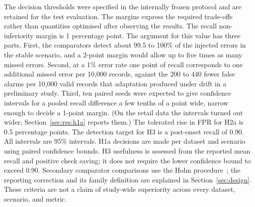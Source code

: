 The decision thresholds were specified in the internally frozen protocol and are retained for the test evaluation. The margins express the required trade-offs rather than quantities optimised after observing the results. The recall non-inferiority margin is 1 percentage point. The argument for this value has three parts. First, the comparators detect about 99.5 to 100\% of the injected errors in the stable scenario, and a 2-point margin would allow up to five times as many missed errors. Second, at a 1\% error rate one point of recall corresponds to one additional missed error per 10,000 records, against the 200 to 440 fewer false alarms per 10,000 valid records that adaptation produced under drift in a preliminary study. Third, ten paired seeds were expected to give confidence intervals for a pooled recall difference a few tenths of a point wide, narrow enough to decide a 1-point margin. (On the retail data the intervals turned out wider; Section~\ref{sec:res:h1a} reports them.) The tolerated rise in FPR for H2a is 0.5 percentage points. The detection target for H3 is a post-onset recall of 0.90. All intervals are 95\% intervals. H1a decisions are made per dataset and scenario using paired confidence bounds. H3 usefulness is assessed from the reported mean recall and positive check saving; it does not require the lower confidence bound to exceed 0.90. Secondary comparator comparisons use the Holm procedure~\cite{Holm1979}; the reporting correction and its family definition are explained in Section~\ref{sec:design}. These criteria are not a claim of study-wide superiority across every dataset, scenario, and metric.
